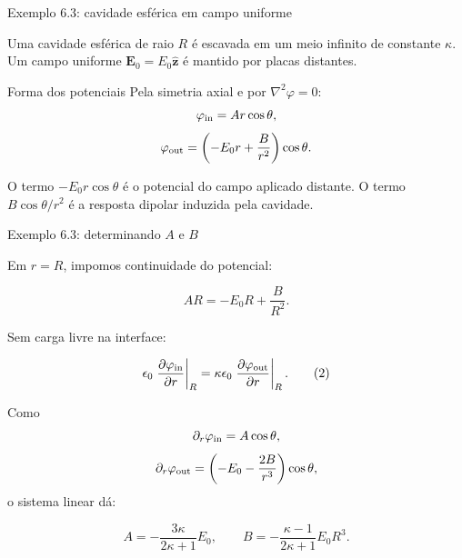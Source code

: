 \documentclass[aspectratio=169]{beamer}
\begin{document}
\begin{frame}{Exemplo 6.3: cavidade esférica em campo uniforme}

\small

Uma cavidade esférica de raio \(R\) é escavada em um meio infinito de constante
\(\kappa\). Um campo uniforme \(\mathbf E_0=E_0\hat{\mathbf z}\) é mantido por
placas distantes.

\begin{mybox}{Forma dos potenciais}
Pela simetria axial e por \(\nabla^2\varphi=0\):
\[
\varphi_{\rm in}=Ar\cos\theta,
\]
\[
\varphi_{\rm out}
=
\left(-E_0r+\frac{B}{r^2}\right)\cos\theta.
\]
\end{mybox}

O termo \(-E_0r\cos\theta\) é o potencial do campo aplicado distante. O termo
\(B\cos\theta/r^2\) é a resposta dipolar induzida pela cavidade.

\end{frame}

\begin{frame}{Exemplo 6.3: determinando \(A\) e \(B\)}

\small

Em \(r=R\), impomos continuidade do potencial:

\[
AR=-E_0R+\frac{B}{R^2}.
\tag{1}
\]

Sem carga livre na interface:

\[
\epsilon_0
\left.
\frac{\partial\varphi_{\rm in}}{\partial r}
\right|_{R}
=
\kappa\epsilon_0
\left.
\frac{\partial\varphi_{\rm out}}{\partial r}
\right|_{R}.
\tag{2}
\]

Como
\[
\partial_r\varphi_{\rm in}=A\cos\theta,
\]
\[
\partial_r\varphi_{\rm out}
=
\left(-E_0-\frac{2B}{r^3}\right)\cos\theta,
\]
o sistema linear dá:

\begin{eqbox}
\[
A=-\frac{3\kappa}{2\kappa+1}E_0,
\qquad
B=-\frac{\kappa-1}{2\kappa+1}E_0R^3.
\]
\end{eqbox}

\end{frame}
\end{document}
